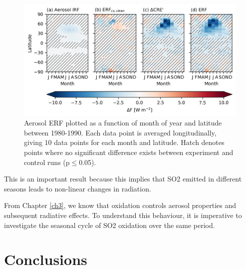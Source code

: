 \begin{figure}
    \centering
    \includegraphics{Chapter4/Figs/seasonal-erf-piaer.png}
    \caption{Aerosol ERF plotted as a function of month of year and latitude between 1980-1990. Each data point is averaged longitudinally, giving 10 data points for each month and latitude. Hatch denotes points where no significant difference exists between experiment and control runs (p$\leq$0.05).}
    \label{fig:ch4:seasonal-erf}
\end{figure}


This is an important result because this implies that SO2 emitted in different seasons leads to non-linear changes in radiation.

From Chapter \ref{ch3}, we know that oxidation controls aerosol properties and subsequent radiative effects. To understand this behaviour, it is imperative to investigate the seasonal cycle of SO2 oxidation over the same period.

\section{Conclusions}